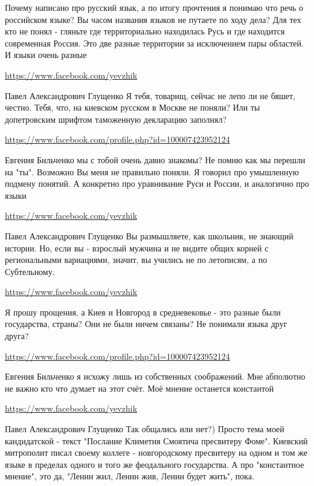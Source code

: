 \documentclass[a4paper,11pt]{extreport}
\begin{document}
\begin{itemize}
Почему написано про русский язык, а по итогу прочтения я понимаю что речь о российском языке? Вы часом названия языков не путаете по ходу дела? Для тех кто не понял - гляньте где территориально находилась Русь и где находится современная Россия. Это две разные территории за исключением пары областей. И языки очень разные

\begin{itemize}
\url{https://www.facebook.com/yevzhik}

Павел Александрович Глущенко Я тебя, товарищ, сейчас не лепо ли не бяшет, честно. Тебя, что, на киевском русском в Москве не поняли? Или ты допетровским шрифтом таможенную декларацию заполнял?

\url{https://www.facebook.com/profile.php?id=100007423952124}

Евгения Бильченко мы с тобой очень давно знакомы? Не помню как мы перешли на "ты".
Возможно Вы меня не правильно поняли. Я говорил про умышленную подмену понятий. А конкретно про уравнивание Руси и России, и аналогично про языки

\url{https://www.facebook.com/yevzhik}

Павел Александрович Глущенко Вы размышляете, как школьник, не знающий истории. Но, если вы - взрослый мужчина и не видите общих корней с региональными вариациями, значит, вы учились не по летописям, а по Субтельному.

\url{https://www.facebook.com/yevzhik}

Я прошу прощения, а Киев и Новгород в средневековье - это разные были государства, страны? Они не были ничем связаны? Не понимали языка друг друга?

\url{https://www.facebook.com/profile.php?id=100007423952124}

Евгения Бильченко я исхожу лишь из собственных соображений. Мне абполютно не важно кто что думает на этот счёт. Моё мнение останется константой

\url{https://www.facebook.com/yevzhik}

Павел Александрович Глущенко Так общались или нет?) Просто тема моей кандидатской - текст "Послание Климетия Смоятича пресвитеру Фоме". Киевский митрополит писал своему коллеге - новгородскому пресвитеру на одном и том же языке в пределах одного и того же феодального государства. А про "константное мнение", это да, "Ленин жил, Ленин жив, Ленин будет жить", пока.


\end{itemize}
\end{itemize}
\end{document}
